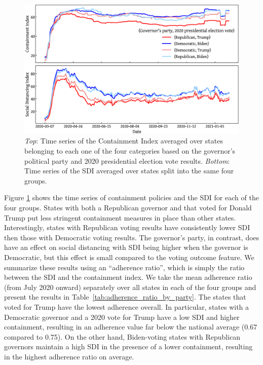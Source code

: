 \documentclass[dvipsnames]{article}
\begin{document}
\begin{figure}[h!]
    \centering
    \includegraphics[width=\textwidth]{sdi_containment_repdem.eps}
    \caption{{\it Top}: Time series of the Containment Index averaged over states belonging to each one of the four categories based on the governor's political party and 2020 presidential election vote results. {\it Bottom}: Time series of the SDI averaged over states split into the same four groups.}
    \label{fig:sdi_containment_repdem}
\end{figure}

Figure \ref{fig:sdi_containment_repdem} shows the time series of containment policies and the SDI for each of the four groups. States with both a Republican governor and that voted for Donald Trump put less stringent containment measures in place than other states. Interestingly, states with Republican voting results have consistently lower SDI then those with Democratic voting results. The governor's party, in contrast, does have an effect on social distancing with SDI being higher when the governor is Democratic, but this effect is small compared to the voting outcome feature. We summarize these results using an ``adherence ratio'', which is simply the ratio between the SDI and the containment index. We take the mean adherence ratio (from July 2020 onward) separately over all states in each of the four groups and present the results in Table~\ref{tab:adherence_ratio_by_party}. The states that voted for Trump have the lowest adherence overall. In particular, states with a Democratic governor and a 2020 vote for Trump have a low SDI and higher containment, resulting in an adherence value far below the national average (0.67 compared to 0.75). On the other hand, Biden-voting states with Republican governors maintain a high SDI in the presence of a lower containment, resulting in the highest adherence ratio on average.
\end{document}
